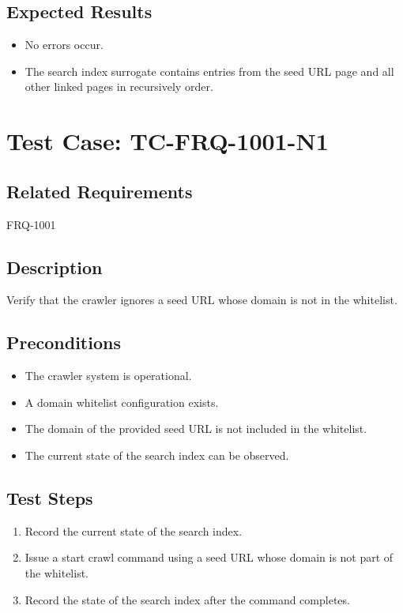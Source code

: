 \documentclass{article}
\begin{document}
\subsection*{Expected Results}
\begin{itemize}
  \item No errors occur.
  \item The search index surrogate contains entries from the seed URL page and all other linked pages in recursively order.
\end{itemize}

\section{Test Case: TC-FRQ-1001-N1}

\subsection*{Related Requirements}
FRQ-1001

\subsection*{Description}
Verify that the crawler ignores a seed URL whose domain is not in the whitelist.

\subsection*{Preconditions}
\begin{itemize}
  \item The crawler system is operational.
  \item A domain whitelist configuration exists.
  \item The domain of the provided seed URL is not included in the whitelist.
  \item The current state of the search index can be observed.
\end{itemize}

\subsection*{Test Steps}
\begin{enumerate}
  \item Record the current state of the search index.
  \item Issue a start crawl command using a seed URL whose domain is not part of the whitelist.
  \item Record the state of the search index after the command completes.
\end{enumerate}
\end{document}
